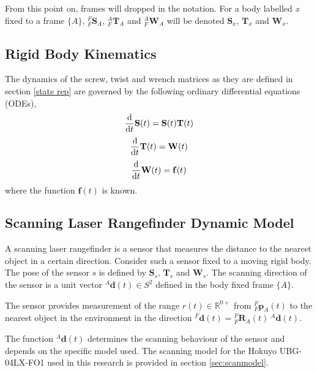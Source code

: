 		From this point on, frames will dropped in the notation. For a body labelled \textit{x} fixed to a frame $\{A\}$, ${^{F}_{F}\mathbf{S}^{}_{A}}$, ${^{A}_{F}\mathbf{T}^{}_{A}}$ and ${^{A}_{F}\mathbf{W}^{}_{A}}$ will be denoted $\mathbf{S}_x$, $\mathbf{T}_x$ and $\mathbf{W}_x$.
						
	\subsection{Rigid Body Kinematics} \label{kinematics}
		The dynamics of the screw, twist and wrench matrices as they are defined in section \ref{state rep} are governed by the following ordinary differential equations (ODEs),
		\begin{equation}
			{\frac{\textnormal{d}}{\textnormal{d}t}} \mathbf{S}(t) =\mathbf{S}(t)\mathbf{T}(t)
		\end{equation}		
		\begin{equation}
			{\frac{\textnormal{d}}{\textnormal{d}t}} \mathbf{T}(t) = \mathbf{W}(t)
		\end{equation}		
		\begin{equation}
			{\frac{\textnormal{d}}{\textnormal{d}t}} \mathbf{W}(t)=\mathbf{f}(t)			
		\end{equation}
		where the function $\mathbf{f}(t)$ is known.
	
	\subsection{Scanning Laser Rangefinder Dynamic Model}
		A scanning laser rangefinder is a sensor that measures the distance to the nearest object in a certain direction. Consider such a sensor fixed to a moving rigid body. The pose of the sensor $s$ is defined by $\mathbf{S}_s$, $\mathbf{T}_s$ and $\mathbf{W}_s$. The scanning direction of the sensor is a unit vector ${^{A}\mathbf{d}(t)} \in S^2$ defined in the body fixed frame $\{A\}$.	
		
		The sensor provides measurement of the range $r(t) \in \mathbb{R}^{0+}$ from $^{F}_{F}\mathbf{p}^{}_{A}(t)$ to the nearest object in the environment in the direction ${^{F}\mathbf{d}(t)} = {^{F}_{F}\mathbf{R}^{}_{A}(t)}\:{^{A}\mathbf{d}(t)}$.
		
		The function ${^{A}\mathbf{d}(t)}$ determines the scanning behaviour of the sensor and depends on the specific model used. The scanning model for the Hokuyo UBG-04LX-FO1 used in this research is provided in section \ref{sec:scanmodel}.
		

